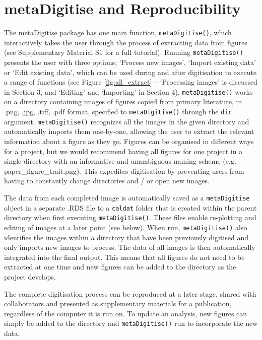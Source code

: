 \documentclass[12pt]{article}
\newcommand{\code}[1]{\texttt{#1}}
\newcommand{\fct}[1]{\texttt{#1()}}
\newcommand{\pkg}[1]{{\fontseries{b}\selectfont #1}}
\begin{document}
\section{\pkg{metaDigitise} and Reproducibility}
The \pkg{metaDigitise} package has one main function, \fct{metaDigitise}, which interactively takes the user through the process of extracting data from figures (see Supplementary Material S1 for a full tutorial). Running \fct{metaDigitise} presents the user with three options; `Process new images', `Import existing data' or `Edit existing data', which can be used during and after digitisation to execute a range of functions (see Figure \ref{fig:all_extract} – `Processing images' is discussed in Section 3, and `Editing' and `Importing' in Section 4). \fct{metaDigitise} works on a directory containing images of figures copied from primary literature, in .png, .jpg, .tiff, .pdf format, specified to \fct{metaDigitise} through the \code{dir} argument. \fct{metaDigitise} recognizes all the images in the given directory and automatically imports them one-by-one, allowing the user to extract the relevant information about a figure as they go. Figures can be organised in different ways for a project, but we would recommend having all figures for one project in a single directory with an informative and unambiguous naming scheme (e.g. paper\_figure\_trait.png). This expedites digitisation by preventing users from having to constantly change directories and / or open new images. 

The data from each completed image is automatically saved as a \code{metaDigitise} object in a separate .RDS file to a \code{caldat} folder that is created within the parent directory when first executing \fct{metaDigitise}. These files enable re-plotting and editing of images at a later point (see below). When run, \fct{metaDigitise} also identifies the images within a directory that have been previously digitised and only imports new images to process. The data of all images is then automatically integrated into the final output. This means that all figures do not need to be extracted at one time and new figures can be added to the directory as the project develops.

The complete digitisation process can be reproduced at a later stage, shared with collaborators and presented as supplementary materials for a publication, regardless of the computer it is run on. To update an analysis, new figures can simply be added to the directory and \fct{metaDigitise} run to incorporate the new data.
\end{document}
